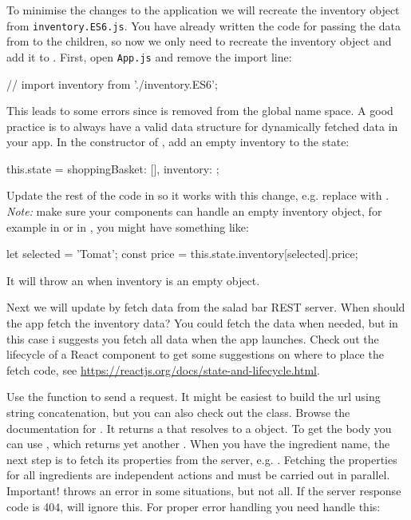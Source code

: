 \documentclass[fleqn, article, a4paper]{memoir}
\begin{document}
\begin{Assignments}
To minimise the changes to the application we will recreate the inventory object from \texttt{inventory.ES6.js}. You have already written the code for passing the data from  to the children, so now we only need to recreate the inventory object and add it to . First, open \texttt{App.js} and remove the import line:
\begin{Code}
// import inventory from './inventory.ES6';
\end{Code}
This leads to some errors since  is removed from the global name space. A good practice is to always have a valid data structure for dynamically fetched data in your app. In the constructor of , add an empty inventory to the state:
\begin{Code}
this.state = {shoppingBasket: [], inventory: {}};
\end{Code}
Update the rest of the code in  so it works with this change, e.g. replace  with . \emph{Note:} make sure your components can handle an empty inventory object, for example in  or in , you might have something like:
\begin{Code}
let selected = 'Tomat';
const price = this.state.inventory[selected].price;
\end{Code}
\noindent It will throw an  when inventory is an empty object.

\item Next we will update  by fetch data from the salad bar REST server. When should the app fetch the inventory data? You could fetch the data when needed, but in this case i suggests you fetch all data when the app launches. Check out the lifecycle of a React component to get some suggestions on where to place the fetch code, see \url{https://reactjs.org/docs/state-and-lifecycle.html}.

Use the  function to send a request. It might be easiest to build the url using string concatenation, but you can also check out the  class. Browse the documentation for . It returns a  that resolves to a  object. To get the body you can use , which returns yet another . When you have the ingredient name, the next step is to fetch its properties from the server, e.g. . Fetching the properties for all ingredients are independent actions and must be carried out in parallel. Important!  throws an error in some situations, but not all. If the server response code is 404,  will ignore this. For proper error handling you need handle this:
\begin{Code}
fetch(url)
.then(response => {
  if(!response.ok) {
    throw new Error(`${url} returned status ${response.status}`);
  }
  return response.json();
}).then (...)
.catch(error =>
  console.error(error);
});
\end{Code}


\end{Assignments}
\end{document}
